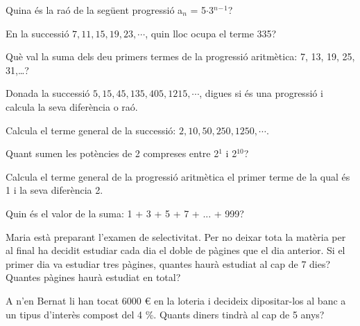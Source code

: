 \pagebreak
\begin{autoaval}{32}

\begin{mylist}

\exer[2]  Quina és la raó de la següent progressió a${}_{ n}$ = 5$\cdot$3\textit{${}^{n}$}${}^{-}$${}^{1}$?

\exer[2]  En la successió $7, 11, 15, 19, 23, \cdots$, quin lloc ocupa el terme 335?

\exer[2]  Què val la suma dels deu primers termes de la progressió aritmètica: 7, 13, 19, 25, 31,{\dots}?
 
\exer[2]  Donada la successió $5, 15, 45, 135, 405, 1215, \cdots$, digues si és una progressió i calcula la seva diferència o raó.

\exer[2]  Calcula el terme general de la successió: $2, 10, 50, 250, 1250, \cdots$.

\exer[2] Quant sumen les potències de 2 compreses entre 2${}^{1}$ i 2${}^{10}$?
 
\exer[2]  Calcula el terme general de la progressió aritmètica el primer terme de la qual és 1 i la seva diferència 2.

\exer[2]  Quin és el valor de la suma: 1 + 3 + 5 + 7 + ... + 999?
 
\exer[2]  Maria està preparant l'examen de selectivitat. Per no deixar tota la matèria per al final ha decidit estudiar cada dia el doble de pàgines que el dia anterior. Si el primer dia va estudiar tres pàgines, quantes haurà estudiat al cap de 7 dies? Quantes pàgines haurà estudiat en total?
 
\exer[2]  A n'en Bernat li han tocat 6000 \euro{} en la loteria i decideix dipositar-los al banc a un tipus d'interès compost del 4 \%. Quants diners tindrà al cap de 5 anys?

\end{mylist}

\end{autoaval}

\vsoo

